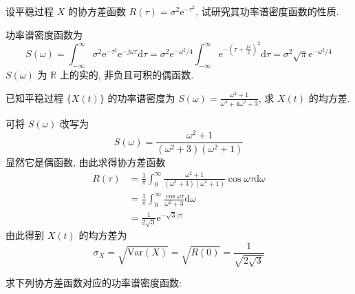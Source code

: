 \documentclass[boxes]{homework}
\begin{document}
\begin{problem}
设平稳过程 $X$ 的协方差函数 $R(\tau) = \sigma^2\mathrm{e}^{-\tau^2}$, 试研究其功率谱密度函数的性质.
\end{problem}
\begin{solution}
    功率谱密度函数为
    \begin{equation}
        S(\omega)=\int_{-\infty}^\infty \sigma^2\mathrm{e}^{-\tau^2}\mathrm{e}^{-j\omega\tau}\mathrm{d}\tau =
        \sigma^2\mathrm{e}^{-\omega^2/4}\int_{-\infty}^{\infty}\mathrm{e}^{-(\tau+\frac{j\omega}{2})^2}\mathrm{d}\tau =
        \sigma^2\sqrt{\pi}\mathrm{e}^{-\omega^2/4}
    \end{equation}
    $S(\omega)$ 为 $\mathbb{R}$ 上的实的, 非负且可积的偶函数.
\end{solution}
\begin{problem}
已知平稳过程 $\{X(t)\}$ 的功率谱密度为
$\displaystyle S(\omega) = \frac{\omega^2 + 1}{\omega^4 + 4\omega^2 + 3}$, 求 $X(t)$ 的均方差.
\end{problem}
\begin{solution}
    可将 $S(\omega)$ 改写为
    \begin{equation}
        S(\omega) = \frac{\omega^2+1}{(\omega^2+3)(\omega^2+1)}
    \end{equation}
    显然它是偶函数, 由此求得协方差函数
    \begin{equation}
        \begin{aligned}
            R(\tau) & = \frac{1}{\pi}\int_0^{\infty}\frac{\omega^2+1}{(\omega^2+3)(\omega^2+1)}\cos \omega\tau\mathrm{d}\omega \\
                    & = \frac{1}{\pi} \int_0^\infty \frac{\cos \omega\tau}{\omega^2+3} \mathrm{d}\omega                        \\
                    & = \frac{1}{2\sqrt{3}}\mathrm{e}^{-\sqrt{3}\lvert\tau\rvert}
        \end{aligned}
    \end{equation}
    由此得到 $X(t)$ 的均方差为
    \begin{equation}
        \sigma_X = \sqrt{\mathrm{Var}(X)} = \sqrt{R(0)} = \frac{1}{\sqrt{2\sqrt{3}}}
    \end{equation}
\end{solution}
\begin{problem}
求下列协方差函数对应的功率谱密度函数:
\end{problem}
\end{document}
